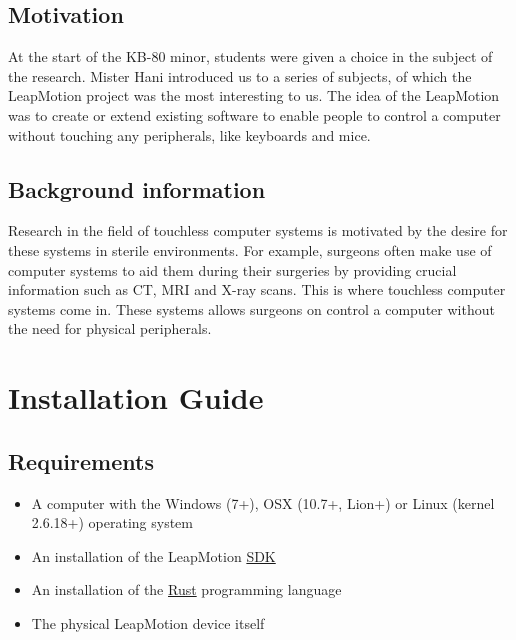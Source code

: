\documentclass[a4paper]{article}
\providecommand{\tightlist}{%
\setlength{\itemsep}{0pt}\setlength{\parskip}{0pt}}
\begin{document}
  \subsection{Motivation}
  At the start of the KB-80 minor, students were given a choice in the subject
  of the research. Mister Hani introduced us to a series of subjects, of which
  the LeapMotion project was the most interesting to us. The idea of the
  LeapMotion was to create or extend existing software to enable people to
  control a computer without touching any peripherals, like keyboards and mice.

  \subsection{Background information}
  Research in the field of touchless computer systems is motivated by the desire
  for these systems in sterile environments. For example, surgeons often make
  use of computer systems to aid them during their surgeries by providing
  crucial information such as CT, MRI and X-ray scans. This is where touchless
  computer systems come in. These systems allows surgeons on control a computer
  without the need for physical peripherals.
  \clearpage

  \section{Installation Guide}
  \subsection{Requirements}
  \begin{itemize}
    \tightlist
    \item A computer with the Windows (7+), OSX (10.7+, Lion+) or
      Linux (kernel 2.6.18+) operating system
    \item An installation of the LeapMotion
      \href{https://developer.leapmotion.com/sdk/v2}{SDK}
    \item An installation of the
      \href{https://rust-lang.org}{Rust} programming language
    \item The physical LeapMotion device itself
  \end{itemize}

\end{document}

